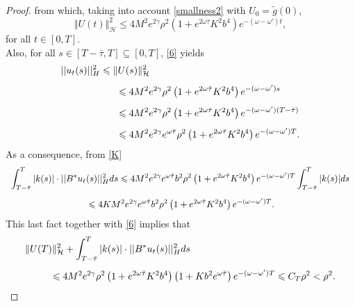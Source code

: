 \documentclass[11pt]{article}
\renewcommand{\leq}{\leqslant}
\renewcommand{\le}{\leqslant}
\begin{document}
\begin{proof}
from which, taking into account \eqref{smallness2} with $U_0=\tilde{g}(0)$,
\begin{equation}\label{6}
	\Vert  U(t)\Vert^2_{\mathcal H}\le 4M^2e^{2\gamma}\rho^2\left(1+e^{2\omega\bar{\tau}}K^2b^4\right)e^{-(\omega-\omega')t},
\end{equation}
for all $t\in [0,T]$.
\\Also, for all $s\in [T-\bar{\tau},T]\subseteq [0,T]$, \eqref{6} yields
$$\begin{array}{l}
	\vspace{0.3cm}\displaystyle{||u_t(s)||_H^2\leq \Vert  U(s)\Vert^2_{\mathcal H}}\\
	\vspace{0.3cm}\displaystyle{\hspace{2.1cm}\leq 4M^2e^{2\gamma}\rho^2\left(1+e^{2\omega\bar{\tau}}K^2b^4\right)e^{-(\omega-\omega')s}}\\
	\vspace{0.3cm}\displaystyle{\hspace{2.1cm}\leq 4M^2e^{2\gamma}\rho^2\left(1+e^{2\omega\bar{\tau}}K^2b^4\right)e^{-(\omega-\omega')(T-\bar{\tau})}}\\
	\displaystyle{\hspace{2.1cm}\leq 4M^2e^{2\gamma}e^{\omega\bar{\tau}}\rho^2\left(1+e^{2\omega\bar{\tau}}K^2b^4\right)e^{-(\omega-\omega')T}.}
\end{array}$$
As a consequence, from \eqref{K}
$$\begin{array}{l}
	\vspace{0.3cm}\displaystyle{\int_{T-\bar{\tau}}^{T}|k(s)| \cdot ||B^*u_t(s)||_H^2 ds\leq 4M^2e^{2\gamma}e^{\omega\bar{\tau}}b^2\rho^2\left(1+e^{2\omega\bar{\tau}}K^2b^4\right)e^{-(\omega-\omega')T}\int_{T-\bar{\tau}}^{T}|k(s)|ds}\\
	\displaystyle{\hspace{3cm}\leq 4KM^2e^{2\gamma}e^{\omega\bar{\tau}}b^2\rho^2 \left(1+e^{2\omega\bar{\tau}}K^2b^4\right)e^{-(\omega-\omega')T}.}
\end{array}$$
This last fact together with \eqref{6} implies that
 \begin{equation}\label{7}
	\begin{array}{l}
		\vspace{0.3cm}\displaystyle{\Vert  U(T)\Vert^2_{\mathcal H}+\int_{T-\bar{\tau}}^{T}|k(s)| \cdot ||B^*u_t(s)||_H^2 ds}\\
		\displaystyle{\hspace{1cm}\leq 4M^2e^{2\gamma}\rho^2 \left(1+e^{2\omega\bar{\tau}}K^2b^4\right)\left(1+Kb^2e^{\omega\bar{\tau}}\right)e^{-(\omega-\omega')T}\leq C_T\rho^2<\rho^2.}

\end{array}
\end{equation}
\end{proof}
\end{document}
